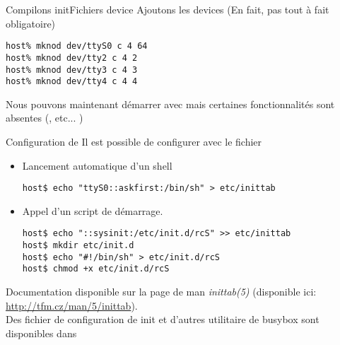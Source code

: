 \begin{frame}[fragile=singleslide]{Compilons init}{Fichiers device}
  Ajoutons  les devices    (En fait,  pas  tout à  fait
  obligatoire)
  \begin{lstlisting}
host% mknod dev/ttyS0 c 4 64
host% mknod dev/tty2 c 4 2
host% mknod dev/tty3 c 4 3
host% mknod dev/tty4 c 4 4
  \end{lstlisting}
  Nous  pouvons  maintenant  démarrer avec    mais
  certaines fonctionnalités sont absentes (, etc... )
\end{frame}

\begin{frame}[fragile=singleslide]{Configuration de }
  Il est possible de configurer  avec le fichier
  \begin{itemize}
  \item Lancement automatique d'un shell
    \begin{lstlisting}
host$ echo "ttyS0::askfirst:/bin/sh" > etc/inittab 
    \end{lstlisting}
  \item Appel d'un script de démarrage.
    \begin{lstlisting}
host$ echo "::sysinit:/etc/init.d/rcS" >> etc/inittab 
host$ mkdir etc/init.d
host$ echo "#!/bin/sh" > etc/init.d/rcS
host$ chmod +x etc/init.d/rcS
    \end{lstlisting}
  \end{itemize}
  Documentation disponible sur la page de man \emph{inittab(5)}
  (disponible ici: \url{http://tfm.cz/man/5/inittab}).\\[2ex]
  Des  fichier de  configuration  de init  et  d'autres utilitaire  de
  busybox sont disponibles dans 
\end{frame}

